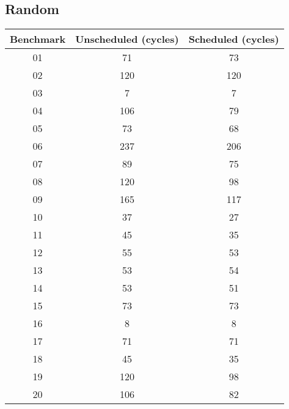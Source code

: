 \documentclass{article}
\begin{document}
\subsection{Random}
\begin{center}
    \begin{tabular} {|c | c | c|}
        \hline
        Benchmark & Unscheduled (cycles)  & Scheduled (cycles) \\ \hline \hline
        01 & 71 & 73 \\ \hline
        02 & 120 & 120 \\ \hline
        03 & 7 & 7 \\ \hline
        04 & 106 & 79 \\ \hline
        05 & 73 & 68 \\ \hline
        06 & 237 & 206 \\ \hline
        07 & 89 & 75 \\ \hline
        08 & 120 & 98 \\ \hline
        09 & 165 & 117 \\ \hline
        10 & 37 & 27 \\ \hline
        11 & 45 & 35 \\ \hline
        12 & 55 & 53 \\ \hline
        13 & 53 & 54 \\ \hline
        14 & 53 & 51 \\ \hline
        15 & 73 & 73 \\ \hline
        16 & 8 & 8 \\ \hline
        17 & 71 & 71 \\ \hline
        18 & 45 & 35 \\ \hline
        19 & 120 & 98 \\ \hline
        20 & 106 & 82 \\ 
        \hline
    \end{tabular}
\end{center}
\end{document}
